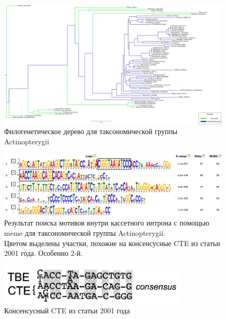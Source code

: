 \newpage
\begin{figure}[h] %
    \centering
    \includegraphics[width=1.0\textwidth]{images/Actinopterygii_tree}
    \caption{Филогенетическое дерево для таксономической группы Actinopterygii}
    \label{fig:Actinopterygii_tree}
\end{figure}


\newpage
\begin{figure}[h] %
    \centering
    \includegraphics[width=1.0\textwidth]{images/Actinopterygii_meme_motifs}
    \caption{Результат поиска мотивов внутри кассетного интрона с помощью meme для таксономической группы Actinopterygii.\\
    Цветом выделены участки, похожие на консенсусные CTE из статьи 2001 года. Особенно 2-й.}
    \label{fig:Actinopterygii_meme}
\end{figure}


\begin{figure}[h] %
    \centering
    \includegraphics[width=0.8\textwidth]{images/CTE_consensus}
    \caption{Консенсусный CTE из статьи 2001 года}
    \label{fig:CTE_consensus}
\end{figure}


